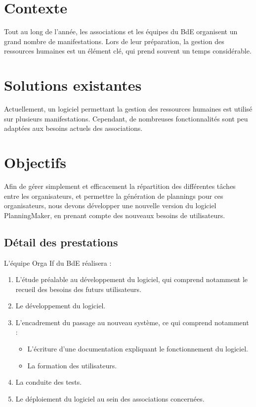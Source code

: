 \section{Contexte}
Tout au long de l'année, les associations et les équipes du BdE organisent un grand nombre de manifestations. Lors de leur préparation, la gestion des ressources humaines est un
 élément clé, qui prend souvent un temps considérable. 


\section{Solutions existantes}
Actuellement, un logiciel permettant la gestion des ressources humaines est utilisé sur plusieurs manifestations. Cependant, de nombreuses fonctionnalités sont peu adaptées aux besoins actuels des associations.


\section{Objectifs}
Afin de gérer simplement et efficacement la répartition des différentes tâches entre les organisateurs, et permettre la génération de plannings pour ces organisateurs, nous devons
développer une nouvelle version du logiciel PlanningMaker, en prenant compte des nouveaux besoins de utilisateurs.

\subsection{Détail des prestations}
L'équipe Orga If du BdE réalisera :
\begin{enumerate}
 \item L'étude préalable au développement du logiciel, qui comprend notamment le recueil des besoins des futurs utilisateurs.
\item Le développement du logiciel.
\item L'encadrement du passage au nouveau système, ce qui comprend notamment : \begin{itemize}
                                                                                \item L'écriture d'une documentation expliquant le fonctionnement du logiciel.
\item La formation des utilisateurs.
                                                                               \end{itemize}
\item La conduite des tests.
\item Le déploiement du logiciel au sein des associations concernées.

\end{enumerate}



